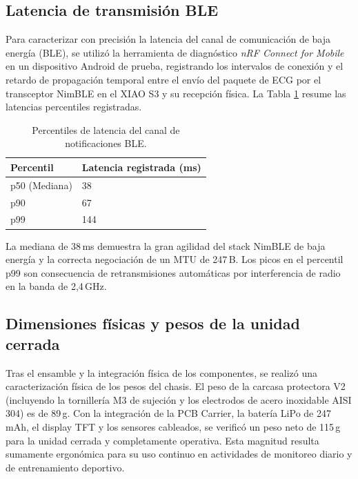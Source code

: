 \documentclass[letterpaper,11pt]{article}
\newcommand{\rtabla}[1]{Tabla \ref{#1}}
\begin{document}
\subsection{Latencia de transmisión BLE}

Para caracterizar con precisión la latencia del canal de comunicación de baja energía (BLE), se utilizó la herramienta de diagnóstico \textit{nRF Connect for Mobile} en un dispositivo Android de prueba, registrando los intervalos de conexión y el retardo de propagación temporal entre el envío del paquete de ECG por el transceptor NimBLE en el XIAO S3 y su recepción física. La \rtabla{tab:ble_latency} resume las latencias percentiles registradas.

\begin{table}[H]
\centering
\caption{Percentiles de latencia del canal de notificaciones BLE.}
\label{tab:ble_latency}
\begin{tabular}{ll}
\toprule
\textbf{Percentil} & \textbf{Latencia registrada (ms)} \\
\midrule
p50 (Mediana) & 38 \\
p90 & 67 \\
p99 & 144 \\
\bottomrule
\end{tabular}
\end{table}

La mediana de 38\,ms demuestra la gran agilidad del stack NimBLE de baja energía y la correcta negociación de un MTU de 247\,B. Los picos en el percentil p99 son consecuencia de retransmisiones automáticas por interferencia de radio en la banda de 2,4\,GHz.

\subsection{Dimensiones físicas y pesos de la unidad cerrada}

Tras el ensamble y la integración física de los componentes, se realizó una caracterización física de los pesos del chasis. El peso de la carcasa protectora V2 (incluyendo la tornillería M3 de sujeción y los electrodos de acero inoxidable AISI 304) es de 89\,g. Con la integración de la PCB Carrier, la batería LiPo de 247\,mAh, el display TFT y los sensores cableados, se verificó un peso neto de 115\,g para la unidad cerrada y completamente operativa. Esta magnitud resulta sumamente ergonómica para su uso continuo en actividades de monitoreo diario y de entrenamiento deportivo.

\newpage
\end{document}
